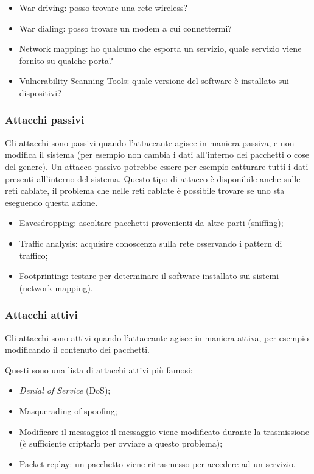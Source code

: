 \begin{itemize}
\item War driving: posso trovare una rete wireless?
\item War dialing: posso trovare un modem a cui connettermi?
\item Network mapping: ho qualcuno che esporta un servizio, quale servizio
viene fornito su qualche porta?
\item Vulnerability-Scanning Tools: quale versione del software è installato
sui dispositivi?
\end{itemize}

\subsubsection{Attacchi passivi}

Gli attacchi sono passivi quando l'attaccante agisce in maniera passiva, e non
modifica il sistema (per esempio non cambia i dati all'interno dei pacchetti o
cose del genere). Un attacco passivo potrebbe essere per esempio catturare
tutti i dati presenti all'interno del sistema. Questo tipo di attacco è
disponibile anche sulle reti cablate, il problema che nelle reti cablate è
possibile trovare se uno sta eseguendo questa azione.

\begin{itemize}
\item Eavesdropping: ascoltare pacchetti provenienti da altre parti (sniffing);
\item Traffic analysis: acquisire conoscenza sulla rete osservando i pattern di
traffico;
\item Footprinting: testare per determinare il software installato sui sistemi
(network mapping).
\end{itemize}

\subsubsection{Attacchi attivi}

Gli attacchi sono attivi quando l'attaccante agisce in maniera attiva, per
esempio modificando il contenuto dei pacchetti.

Questi sono una lista di attacchi attivi più famosi:
\begin{itemize}
\item \textit{Denial of Service} (DoS);
\item Masquerading of spoofing;
\item Modificare il messaggio: il messaggio viene modificato durante la
trasmissione (è sufficiente criptarlo per ovviare a questo problema);
\item Packet replay: un pacchetto viene ritrasmesso per accedere ad un 
servizio.
\end{itemize}


